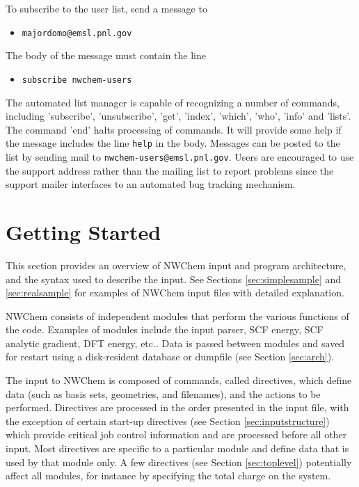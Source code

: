 To subscribe to the user list, send a message to 

\begin{itemize}
\item {\tt majordomo@emsl.pnl.gov}
\end{itemize}

The body of the message must contain the line 

\begin{itemize}
\item {\tt subscribe nwchem-users}
\end{itemize}

The automated list manager is capable of recognizing a number of
commands, including 'subscribe', 'unsubscribe', 'get', 'index',
'which', 'who', 'info' and 'lists'.  The command 'end' halts
processing of commands.  It will provide some help if the message
includes the line {\tt help} in the body.  Messages can be posted to
the list by sending mail to {\tt nwchem-users@emsl.pnl.gov}.  Users
are encouraged to use the support address rather than the mailing list
to report problems since the support mailer interfaces to an automated
bug tracking mechanism.

\section{Getting Started}
\label{sec:getstart}

This section provides an overview of NWChem input and program
architecture, and the syntax used to describe the input.  See Sections
\ref{sec:simplesample} and \ref{sec:realsample} for examples of NWChem
input files with detailed explanation.

NWChem consists of independent modules that perform the various
functions of the code.  Examples of modules include the input parser,
SCF energy, SCF analytic gradient, DFT energy, etc..  Data is passed
between modules and saved for restart using a disk-resident database
or dumpfile (see Section \ref{sec:arch}).

The input to NWChem is composed of commands, called directives, which
define data (such as basis sets, geometries, and filenames), and the
actions to be performed.  Directives are processed in the order
presented in the input file, with the exception of certain start-up
directives (see Section \ref{sec:inputstructure}) which provide
critical job control information and are processed before all other
input.  Most directives are specific to a particular module and define
data that is used by that module only.  A few directives (see Section
\ref{sec:toplevel}) potentially affect all modules, for instance by
specifying the total charge on the system.  

